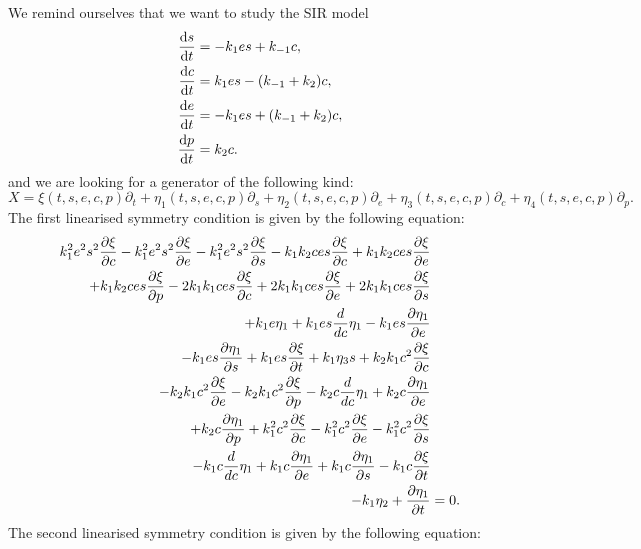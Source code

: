 We remind ourselves that we want to study the SIR model
\begin{equation*}
  \begin{split}
    \dv{s}{t}&=-k_1 es+k_{-1}c,\\
    \dv{c}{t}&=k_1 es-(k_{-1}+k_2)c,\\
    \dv{e}{t}&=-k_1 es+(k_{-1}+k_2)c,\\
    \dv{p}{t}&=k_2 c.\\        
    \end{split}
  \label{eq:MM}
\end{equation*}
  and we are looking for a generator of the following kind:
\begin{equation}
X=\xi(t,s,e,c,p)\partial_t+\eta_1(t,s,e,c,p)\partial_s+\eta_2(t,s,e,c,p)\partial_e+\eta_3(t,s,e,c,p)\partial_c+\eta_4(t,s,e,c,p)\partial_p.
\end{equation}
The first linearised symmetry condition is given by the following equation:
\begin{align}
  k_{1}^{2} e^{2} s^{2} \pdv{\xi}{c} - k_{1}^{2} e^{2} s^{2} \pdv{\xi}{e} - k_{1}^{2} e^{2} s^{2} \pdv{\xi}{s} - k_{1} k_{2} c e s \pdv{\xi}{c} + k_{1} k_{2} c e s \pdv{\xi}{e}&\nonumber\\
  + k_{1} k_{2} c e s \pdv{\xi}{p} - 2 k_{1} k_{1} c e s \pdv{\xi}{c} + 2 k_{1} k_{1} c e s \pdv{\xi}{e} + 2 k_{1} k_{1} c e s \pdv{\xi}{s}&\nonumber\\
  + k_{1} e \eta_1 + k_{1} e s \frac{d}{d c} \eta_1 - k_{1} e s \pdv{\eta_1}{e} &\nonumber\\
  - k_{1} e s \pdv{\eta_1}{s} + k_{1} e s \pdv{\xi}{t} + k_{1} \eta_3 s + k_{2} k_{1} c^{2} \pdv{\xi}{c}&\nonumber\\
  - k_{2} k_{1} c^{2} \pdv{\xi}{e} - k_{2} k_{1} c^{2} \pdv{\xi}{p} - k_{2} c \frac{d}{d c} \eta_1 + k_{2} c \pdv{\eta_1}{e}&\nonumber\\
  + k_{2} c \pdv{\eta_1}{p} + k_{1}^{2} c^{2} \pdv{\xi}{c} - k_{1}^{2} c^{2} \pdv{\xi}{e} - k_{1}^{2} c^{2} \pdv{\xi}{s}&\nonumber\\
  - k_{1} c \frac{d}{d c} \eta_1 + k_{1} c \pdv{\eta_1}{e} + k_{1} c \pdv{\eta_1}{s} - k_{1} c \pdv{\xi}{t} &\nonumber\\
  - k_{1} \eta_2 + \pdv{\eta_1}{t}&=0.\label{eq:MM_lin_sym_1}
\end{align}
The second linearised symmetry condition is given by the following equation:
